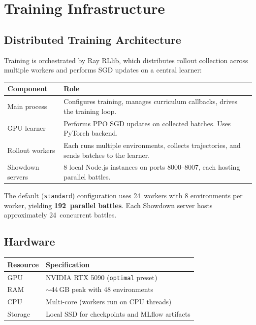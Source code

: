 \section{Training Infrastructure}
\label{sec:infrastructure}

\subsection{Distributed Training Architecture}

Training is orchestrated by Ray RLlib, which distributes rollout collection
across multiple workers and performs SGD updates on a central learner:

\begin{center}
\small
\begin{tabularx}{\textwidth}{l X}
  \toprule
  \textbf{Component} & \textbf{Role} \\
  \midrule
  Main process   & Configures training, manages curriculum callbacks,
                   drives the training loop. \\
  GPU learner     & Performs PPO SGD updates on collected batches.
                   Uses PyTorch backend. \\
  Rollout workers & Each runs multiple environments, collects trajectories,
                   and sends batches to the learner. \\
  Showdown servers & 8 local Node.js instances on ports 8000--8007,
                     each hosting parallel battles. \\
  \bottomrule
\end{tabularx}
\end{center}

The default (\texttt{standard}) configuration uses 24~workers with 8
environments per worker, yielding \textbf{192~parallel battles}.  Each Showdown
server hosts approximately 24~concurrent battles.

\subsection{Hardware}

\begin{center}
\small
\begin{tabularx}{0.8\textwidth}{l l}
  \toprule
  \textbf{Resource} & \textbf{Specification} \\
  \midrule
  GPU         & NVIDIA RTX 5090 (\texttt{optimal} preset) \\
  RAM         & $\sim$44\,GB peak with 48 environments \\
  CPU         & Multi-core (workers run on CPU threads) \\
  Storage     & Local SSD for checkpoints and MLflow artifacts \\
  \bottomrule
\end{tabularx}
\end{center}

